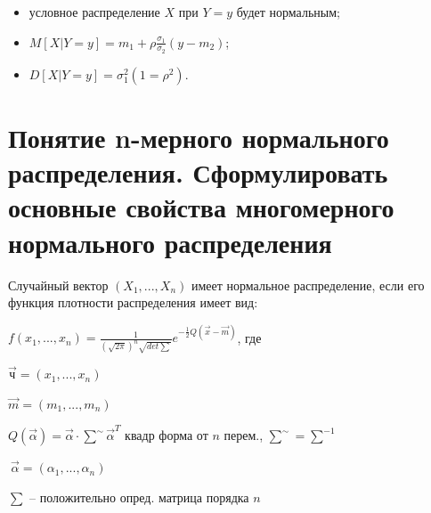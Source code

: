 \begin{itemize}
	\item условное распределение $X$ при $Y = y$ будет нормальным;
	\item $M[X|Y = y] = m_1 + \rho \frac{\sigma_1}{\sigma_2}(y - m_2)$;
	\item $D[X|Y = y] = \sigma_1^2(1 = \rho^2)$.
\end{itemize}

\section{Понятие n-мерного нормального распределения. Сформулировать основные свойства многомерного нормального распределения}

Случайный вектор $(X_1,...,X_n)$ имеет нормальное распределение, если его функция плотности распределения имеет вид: 

$f(x_1,...,x_n)=\tfrac{1}{(\sqrt{2\pi})^n\sqrt{det\sum}}e^{-\tfrac{1}{2}Q(\vec{x}-\vec{m})}$, где

$\vec{ч}=(x_1,...,x_n)$

$\vec{m}=(m_1,...,m_n)$

$Q(\vec{\alpha})=\vec{\alpha}\cdot\sum^{\sim}\vec{\alpha}^T$ квадр форма от $n$ перем., $\sum^{\sim}=\sum^{-1}$

$~\vec{\alpha}=(\alpha_1,...,\alpha_n)$

$\sum$ -- положительно опред. матрица порядка $n$

~

